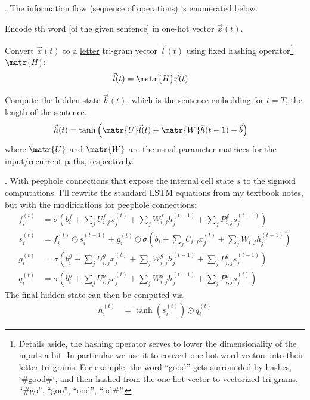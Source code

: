 \documentclass[11pt]{article}
\begin{document}
\p {}. The information flow (sequence of operations) is enumerated below.
\begin{compactenum}
	\item Encode $t$th word [of the given sentence] in one-hot vector $\vec{x}(t)$. 
	
	\item Convert $\vec{x}(t)$ to a \underline{letter} tri-gram vector $\vec{l}(t)$ using fixed hashing operator\footnote{Details aside, the hashing operator serves to lower the dimensionality of the inputs a bit. In particular we use it to convert one-hot word vectors into their letter tri-grams. For example, the word ``good'' gets surrounded by hashes, `\#good\#`, and then hashed from the one-hot vector to vectorized tri-grams, ``\#go'', ``goo'', ``ood'', ``od\#''.} $\matr{H}$:
	\begin{align}
	\vec{l}(t) &= \matr{H} \vec{x}(t)
	\end{align}
	
	\item Compute the hidden state $\vec{h}(t)$, which is the sentence embedding for $t = T$, the length of the sentence.
	\begin{align}
	\vec{h}(t) &= \tanh \left(\matr{U} \vec{l}(t) + \matr{W} \vec{h}(t - 1) + \vec{b} \right)
	\end{align}
	where $\matr{U}$ and $\matr{W}$ are the usual parameter matrices for the input/recurrent paths, respectively.
\end{compactenum}

\myspace
\p {}. With peephole connections that expose the internal cell state $s$ to the sigmoid computations. I'll rewrite the standard LSTM equations from my textbook notes, but with the modifications for peephole connections:
\begin{align}
f_i^{(t)} 
&= \sigma\left(b_i^f + \sum_j U_{i,j}^f x_j^{(t)} + \sum_j W_{i,j}^f h_j^{(t-1)}
+  \sum_j P_{i,j}^f s_j^{(t - 1)} \right) \\
s_i^{(t)} 
&= f_i^{(t)} \odot s_i^{(t-1)} + g_i^{(t)} \odot \sigma\left(b_i + \sum_j U_{i,j} x_j^{(t)} + \sum_j W_{i,j} h_j^{(t-1)} \right) \\
g_i^{(t)}
&= \sigma\left(b_i^g + \sum_j U_{i,j}^g x_j^{(t)} + \sum_j W_{i,j}^g h_j^{(t-1)} 
+ \sum_j P_{i,j}^g s_j^{(t - 1)} \right) \\
q_i^{(t)}
&= \sigma\left(b_i^o + \sum_j U_{i,j}^o x_j^{(t)} + \sum_j W_{i,j}^o h_j^{(t-1)} 
+ \sum_j P_{i,j}^o s_j^{(t)}\right) 
\end{align}
The final hidden state can then be computed via
\begin{align}
h_i^{(t)} &= \tanh(s_i^{(t)}) \odot q_i^{(t)}
\end{align}
\end{document}
